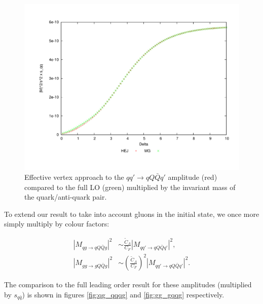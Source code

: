 \begin{figure}[H]
\centering
\includegraphics[scale=0.45]{Images/qQ_qqqxQ_sqqx.pdf}
\caption{Effective vertex approach to the $qq' \to qQ\bar{Q}q'$ amplitude (red) compared to the full LO (green) multiplied by the invariant mass of the quark/anti-quark pair.}
\label{fig:qq_qqqq_sqq}
\end{figure}

To extend our result to take into account gluons in the initial state, we once more simply multiply by colour factors:

\begin{equation}
\begin{split}
|M_{qg \to qQ\bar{Q}g}|^2 &\sim \frac{\tilde{C}_A}{C_F} |M_{qq' \to qQ\bar{Q}q'}|^2, \\
|M_{gg \to gQ\bar{Q}g}|^2 &\sim \left(\frac{\tilde{C}_A}{C_F}\right)^2 |M_{qq' \to qQ\bar{Q}q'}|^2.
\end{split}
\end{equation}

The comparison to the full leading order result for these amplitudes (multiplied by $s_{q\bar{q}}$) is shown in figures \ref{fig:qg_qqqg} and \ref{fig:gg_gqqg} respectively. 

